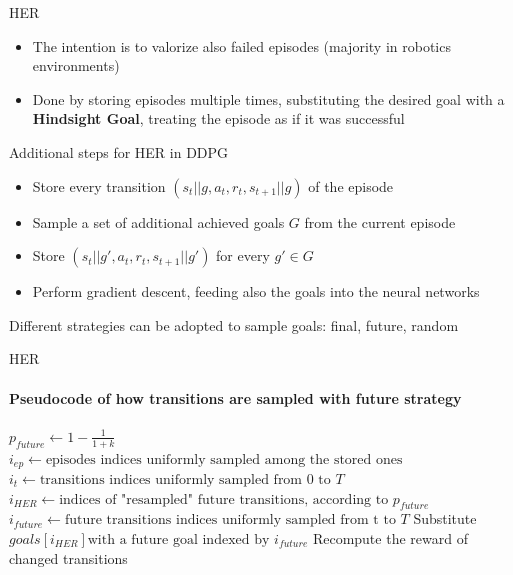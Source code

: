 \documentclass{beamer}
\begin{document}
      \begin{frame}[fragile]{HER}
            \begin{itemize}
                  \item The intention is to valorize also failed episodes (majority in robotics environments)
                  \item Done by storing episodes multiple times, substituting the desired goal with a \textbf{Hindsight Goal}, treating the episode as if it was successful
            \end{itemize}
            \begin{block}{Additional steps for HER in DDPG}
                  \begin{itemize}
                        \item Store every transition $\left( s_t||g, a_t, r_t, s_{t+1}||g\right)$ of the episode
                        \item Sample a set of additional achieved goals $G$ from the current episode
                        \item Store $\left( s_t||g', a_t, r_t, s_{t+1}||g'\right)$ for every $g' \in G$
                        \item Perform gradient descent, feeding also the goals into the neural networks
                  \end{itemize}
            \end{block}
            Different strategies can be adopted to sample goals: final, future, random
      \end{frame}

      \begin{frame}[fragile]{HER}
      \framesubtitle{Pseudocode of how transitions are sampled with future strategy}
            \begin{algorithmic}[1]
                  \State $p_{future} \gets 1-\frac{1}{1+k}$  
                  \State $i_{ep} \gets \text{episodes indices uniformly sampled among the stored ones}$
                  \State $i_{t} \gets \text{transitions indices uniformly sampled from 0 to } T$
                  \State $i_{HER} \gets \text{indices of "resampled" future transitions, according to } p_{future}$
                  \State $i_{future} \gets \text{future transitions indices uniformly sampled from t to } T$
                  \State Substitute $goals[i_{HER}] \text{with a future goal indexed by } i_{future}$
                  \State Recompute the reward of changed transitions
            \end{algorithmic}
      \end{frame}
\end{document}
